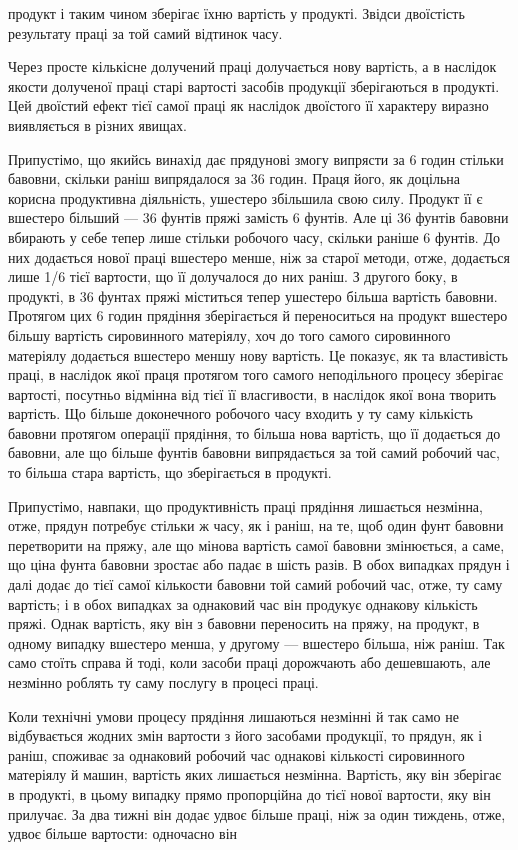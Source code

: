 продукт і таким чином зберігає їхню вартість у продукті. Звідси
двоїстість результату праці за той самий відтинок часу.

Через просте кількісне долучений праці долучається нову
вартість, а в наслідок якости долученої праці старі вартості засобів
продукції зберігаються в продукті. Цей двоїстий ефект тієї
самої праці як наслідок двоїстого її характеру виразно виявляється
в різних явищах.

Припустімо, що якийсь винахід дає прядунові змогу випрясти
за 6 годин стільки бавовни, скільки раніш випрядалося за 36 годин.
Праця його, як доцільна корисна продуктивна діяльність,
ушестеро збільшила свою силу. Продукт її є вшестеро більший —
36 фунтів пряжі замість 6 фунтів. Але ці 36 фунтів бавовни вбирають
у себе тепер лише стільки робочого часу, скільки раніше
6 фунтів. До них додається нової праці вшестеро менше, ніж за
старої методи, отже, додається лише 1/6 тієї вартости, що її долучалося
до них раніш. З другого боку, в продукті, в 36 фунтах
пряжі міститься тепер ушестеро більша вартість бавовни. Протягом
цих 6 годин прядіння зберігається й переноситься на продукт
вшестеро більшу вартість сировинного матеріялу, хоч до
того самого сировинного матеріялу додається вшестеро меншу
нову вартість. Це показує, як та властивість праці, в наслідок
якої праця протягом того самого неподільного процесу зберігає
вартості, посутньо відмінна від тієї її власгивости, в наслідок
якої вона творить вартість. Що більше доконечного робочого
часу входить у ту саму кількість бавовни протягом операції
прядіння, то більша нова вартість, що її додається до бавовни,
але що більше фунтів бавовни випрядається за той самий робочий
час, то більша стара вартість, що зберігається в продукті.

Припустімо, навпаки, що продуктивність праці прядіння лишається
незмінна, отже, прядун потребує стільки ж часу, як і раніш,
на те, щоб один фунт бавовни перетворити на пряжу, але що
мінова вартість самої бавовни змінюється, а саме, що ціна фунта
бавовни зростає або падає в шість разів. В обох випадках прядун
і далі додає до тієї самої кількости бавовни той самий робочий
час, отже, ту саму вартість; і в обох випадках за однаковий час
він продукує однакову кількість пряжі. Однак вартість, яку він
з бавовни переносить на пряжу, на продукт, в одному випадку
вшестеро менша, у другому — вшестеро більша, ніж раніш. Так
само стоїть справа й тоді, коли засоби праці дорожчають або
дешевшають, але незмінно роблять ту саму послугу в процесі
праці.

Коли технічні умови процесу прядіння лишаються незмінні
й так само не відбувається жодних змін вартости з його засобами
продукції, то прядун, як і раніш, споживає за однаковий робочий
час однакові кількості сировинного матеріялу й машин, вартість
яких лишається незмінна. Вартість, яку він зберігає в продукті,
в цьому випадку прямо пропорційна до тієї нової вартости, яку
він прилучає. За два тижні він додає удвоє більше праці, ніж
за один тиждень, отже, удвоє більше вартости: одночасно він
